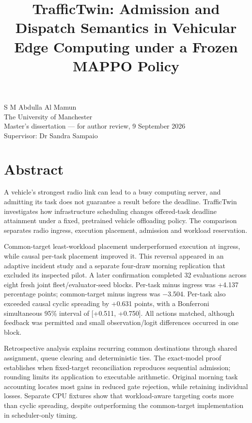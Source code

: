 \documentclass[11pt,a4paper]{article}
\title{TrafficTwin: Admission and Dispatch Semantics in Vehicular Edge Computing under a Frozen MAPPO Policy}
\author{}
\date{}
\begin{document}
\maketitle
S M Abdulla Al Mamun\\
The University of Manchester\\
Master's dissertation --- for author review, 9 September 2026\\
Supervisor: Dr Sandra Sampaio

\section*{Abstract}\label{sec:abstract}

A vehicle's strongest radio link can lead to a busy computing server, and admitting its task does not guarantee a result before the deadline. TrafficTwin investigates how infrastructure scheduling changes offered-task deadline attainment under a fixed, pretrained vehicle offloading policy. The comparison separates radio ingress, execution placement, admission and workload reservation.

Common-target least-workload placement underperformed execution at ingress, while causal per-task placement improved it. This reversal appeared in an adaptive incident study and a separate four-draw morning replication that excluded its inspected pilot. A later confirmation completed 32 evaluations across eight fresh joint fleet/evaluator-seed blocks. Per-task minus ingress was +4.137 percentage points; common-target minus ingress was \ensuremath{-}3.504. Per-task also exceeded causal cyclic spreading by +0.631 points, with a Bonferroni simultaneous 95\% interval of [+0.511, +0.750]. All actions matched, although feedback was permitted and small observation/logit differences occurred in one block.

Retrospective analysis explains recurring common destinations through shared assignment, queue clearing and deterministic ties. The exact-model proof establishes when fixed-target reconciliation reproduces sequential admission; rounding limits its application to executable arithmetic. Original morning task accounting locates most gains in reduced gate rejection, while retaining individual losses. Separate CPU fixtures show that workload-aware targeting costs more than cyclic spreading, despite outperforming the common-target implementation in scheduler-only timing.
\end{document}
